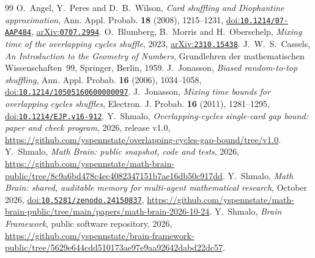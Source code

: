 \documentclass[11pt]{amsart}
\theoremstyle{remark}
\newcommand{\doi}[1]{\href{https://doi.org/#1}{doi:\nolinkurl{#1}}}
\newcommand{\arxiv}[1]{\href{https://arxiv.org/abs/#1}{arXiv:\nolinkurl{#1}}}
\begin{document}
\begin{thebibliography}{99}
 O.~Angel, Y.~Peres and D.~B.~Wilson, \emph{Card shuffling and Diophantine approximation}, Ann. Appl.
Probab. \textbf{18} (2008), 1215--1231, \doi{10.1214/07-AAP484}, \arxiv{0707.2994}.
 O.~Blumberg, B.~Morris and H.~Oberschelp, \emph{Mixing time of the overlapping cycles shuffle}, 2023,
\arxiv{2310.15438}.
 J.~W.~S.~Cassels, \emph{An Introduction to the Geometry of Numbers}, Grundlehren der mathematischen
Wissenschaften~99, Springer, Berlin, 1959.
 J.~Jonasson, \emph{Biased random-to-top shuffling}, Ann. Appl. Probab. \textbf{16} (2006), 1034--1058, \doi{10.1214/10505160600000097}.
 J.~Jonasson, \emph{Mixing time bounds for overlapping cycles shuffles}, Electron. J. Probab.
\textbf{16} (2011), 1281--1295, \doi{10.1214/EJP.v16-912}.
 Y.~Shmalo, \emph{Overlapping-cycles single-card gap bound: paper and check program}, 2026,
release v1.0, \url{https://github.com/yspennstate/overlapping-cycles-gap-bound/tree/v1.0}.
 Y.~Shmalo, \emph{Math Brain: public snapshot, code and tests}, 2026,
\url{https://github.com/yspennstate/math-brain-public/tree/8c9a6bd478c4ec4082347151b7ae16db50c917dd}.
 Y.~Shmalo, \emph{Math Brain: shared, auditable memory for multi-agent mathematical research},
October 2026, \doi{10.5281/zenodo.24150837},
\url{https://github.com/yspennstate/math-brain-public/tree/main/papers/math-brain-2026-10-24}.
 Y.~Shmalo, \emph{Brain Framework}, public software repository, 2026,
\url{https://github.com/yspennstate/brain-framework-public/tree/5629e644cdd510173ae97e9aa92642dabd22dc57}.
\end{thebibliography}
\end{document}
